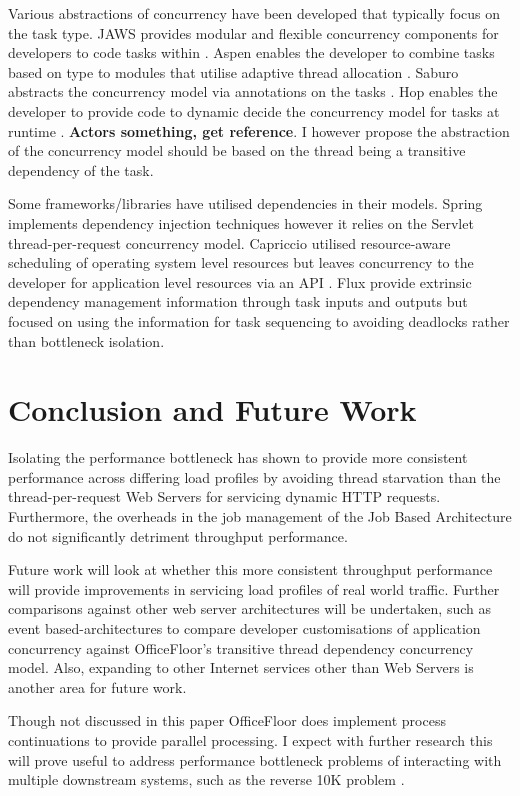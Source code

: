 \documentclass[conference]{ieee/IEEEtran}
\begin{document}
Various abstractions of concurrency have been developed that typically focus on
the task type.  JAWS provides modular and flexible concurrency components for
developers to code tasks within \cite{jaws}.  Aspen enables the developer to
combine tasks based on type to modules that utilise adaptive thread allocation
\cite{aspen}.  Saburo abstracts the concurrency model via annotations on the
tasks \cite{saburo}.  Hop enables the developer to provide code to dynamic
decide the concurrency model for tasks at runtime \cite{hop}. \textbf{Actors
something, get reference}.  I however propose the abstraction of the concurrency
model should be based on the thread being a transitive dependency of the task.

Some frameworks/libraries have utilised dependencies in their models.  Spring
implements dependency injection techniques \cite{ioc} however it relies on the
Servlet thread-per-request concurrency model.  Capriccio utilised resource-aware
scheduling of operating system level resources but leaves concurrency to the
developer for application level resources via an API \cite{capriccio}.  Flux
\cite{flux} provide extrinsic dependency management information through task
inputs and outputs but focused on using the information for task sequencing to
avoiding deadlocks rather than bottleneck isolation.



\section{Conclusion and Future Work}
Isolating the performance bottleneck has shown to provide more consistent
performance across differing load profiles by avoiding thread starvation than
the thread-per-request Web Servers for servicing dynamic HTTP requests. 
Furthermore, the overheads in the job management of the Job Based Architecture do not significantly detriment
throughput performance.

Future work will look at whether this more consistent throughput performance
will provide improvements in servicing load profiles of real world traffic.
Further comparisons against other web server architectures will be undertaken,
such as event based-architectures to compare developer customisations of
application concurrency against OfficeFloor's transitive thread dependency
concurrency model.  Also, expanding to other Internet services other than Web
Servers is another area for future work.

Though not discussed in this paper OfficeFloor does implement process
continuations \cite{process-continuation} to provide parallel processing.  I
expect with further research this will prove useful to address performance
bottleneck problems of interacting with multiple downstream systems, such as the
reverse 10K problem \cite{reverse-ten-k-problem}.
\end{document}

